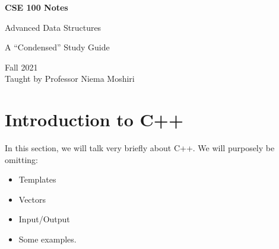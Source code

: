\documentclass[letterpaper]{article}
\begin{document}
\begin{titlepage}
    \begin{center}
        \vspace*{1cm}
            
        \Huge
        \textbf{CSE 100 Notes}
            
        \vspace{0.5cm}
        \LARGE
        Advanced Data Structures
            
        \vspace{0.5cm}
            
        \large
        A ``Condensed'' Study Guide
        
        \vspace{1.5cm}

        \vfill
            
        Fall 2021\\
        Taught by Professor Niema Moshiri
    \end{center}
\end{titlepage}


\newpage 

\begingroup
    \renewcommand\contentsname{Table of Contents}
    \tableofcontents
\endgroup

\newpage
{}


\section{Introduction to C++}
In this section, we will talk very briefly about C++. We will purposely be omitting:
\begin{itemize}
    \item Templates 
    \item Vectors 
    \item Input/Output 
    \item Some examples.
\end{itemize}
\end{document}
